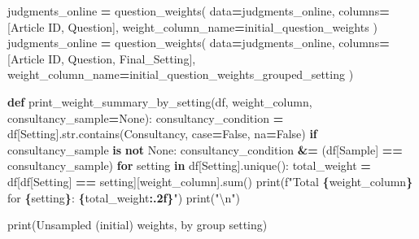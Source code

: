 \documentclass[
]{article}
\newenvironment{Shaded}{\begin{snugshade}}{\end{snugshade}}
\newcommand{\BuiltInTok}[1]{#1}
\newcommand{\CharTok}[1]{\textcolor[rgb]{0.31,0.60,0.02}{#1}}
\newcommand{\ControlFlowTok}[1]{\textcolor[rgb]{0.13,0.29,0.53}{\textbf{#1}}}
\newcommand{\KeywordTok}[1]{\textcolor[rgb]{0.13,0.29,0.53}{\textbf{#1}}}
\newcommand{\NormalTok}[1]{#1}
\newcommand{\OperatorTok}[1]{\textcolor[rgb]{0.81,0.36,0.00}{\textbf{#1}}}
\newcommand{\SpecialCharTok}[1]{\textcolor[rgb]{0.81,0.36,0.00}{\textbf{#1}}}
\newcommand{\SpecialStringTok}[1]{\textcolor[rgb]{0.31,0.60,0.02}{#1}}
\newcommand{\StringTok}[1]{\textcolor[rgb]{0.31,0.60,0.02}{#1}}
\newcommand{\VariableTok}[1]{\textcolor[rgb]{0.00,0.00,0.00}{#1}}
\begin{document}
\begin{Shaded}
\begin{Highlighting}[]
\NormalTok{judgments\_online }\OperatorTok{=}\NormalTok{ question\_weights(}
\NormalTok{    data}\OperatorTok{=}\NormalTok{judgments\_online, }
\NormalTok{    columns}\OperatorTok{=}\NormalTok{[}\StringTok{\textquotesingle{}Article ID\textquotesingle{}}\NormalTok{, }\StringTok{\textquotesingle{}Question\textquotesingle{}}\NormalTok{], }
\NormalTok{    weight\_column\_name}\OperatorTok{=}\StringTok{\textquotesingle{}initial\_question\_weights\textquotesingle{}}
\NormalTok{)}
\NormalTok{judgments\_online }\OperatorTok{=}\NormalTok{ question\_weights(}
\NormalTok{    data}\OperatorTok{=}\NormalTok{judgments\_online, }
\NormalTok{    columns}\OperatorTok{=}\NormalTok{[}\StringTok{\textquotesingle{}Article ID\textquotesingle{}}\NormalTok{, }\StringTok{\textquotesingle{}Question\textquotesingle{}}\NormalTok{, }\StringTok{\textquotesingle{}Final\_Setting\textquotesingle{}}\NormalTok{], }
\NormalTok{    weight\_column\_name}\OperatorTok{=}\StringTok{\textquotesingle{}initial\_question\_weights\_grouped\_setting\textquotesingle{}}
\NormalTok{)}
\end{Highlighting}
\end{Shaded}

\begin{Shaded}
\begin{Highlighting}[]
\KeywordTok{def}\NormalTok{ print\_weight\_summary\_by\_setting(df, weight\_column, consultancy\_sample}\OperatorTok{=}\VariableTok{None}\NormalTok{):}
\NormalTok{    consultancy\_condition }\OperatorTok{=}\NormalTok{ df[}\StringTok{\textquotesingle{}Setting\textquotesingle{}}\NormalTok{].}\BuiltInTok{str}\NormalTok{.contains(}\StringTok{\textquotesingle{}Consultancy\textquotesingle{}}\NormalTok{, case}\OperatorTok{=}\VariableTok{False}\NormalTok{, na}\OperatorTok{=}\VariableTok{False}\NormalTok{)}
    \ControlFlowTok{if}\NormalTok{ consultancy\_sample }\KeywordTok{is} \KeywordTok{not} \VariableTok{None}\NormalTok{:}
\NormalTok{        consultancy\_condition }\OperatorTok{\&=}\NormalTok{ (df[}\StringTok{\textquotesingle{}Sample\textquotesingle{}}\NormalTok{] }\OperatorTok{==}\NormalTok{ consultancy\_sample)}
    \ControlFlowTok{for}\NormalTok{ setting }\KeywordTok{in}\NormalTok{ df[}\StringTok{\textquotesingle{}Setting\textquotesingle{}}\NormalTok{].unique():}
\NormalTok{        total\_weight }\OperatorTok{=}\NormalTok{ df[df[}\StringTok{\textquotesingle{}Setting\textquotesingle{}}\NormalTok{] }\OperatorTok{==}\NormalTok{ setting][weight\_column].}\BuiltInTok{sum}\NormalTok{()}
        \BuiltInTok{print}\NormalTok{(}\SpecialStringTok{f"Total }\SpecialCharTok{\{}\NormalTok{weight\_column}\SpecialCharTok{\}}\SpecialStringTok{ for }\SpecialCharTok{\{}\NormalTok{setting}\SpecialCharTok{\}}\SpecialStringTok{: }\SpecialCharTok{\{}\NormalTok{total\_weight}\SpecialCharTok{:.2f\}}\SpecialStringTok{"}\NormalTok{)}
    \BuiltInTok{print}\NormalTok{(}\StringTok{"}\CharTok{\textbackslash{}n}\StringTok{"}\NormalTok{)}

\BuiltInTok{print}\NormalTok{(}\StringTok{\textquotesingle{}Unsampled (initial) weights, by group setting\textquotesingle{}}\NormalTok{)}
\end{Highlighting}
\end{Shaded}
\end{document}
